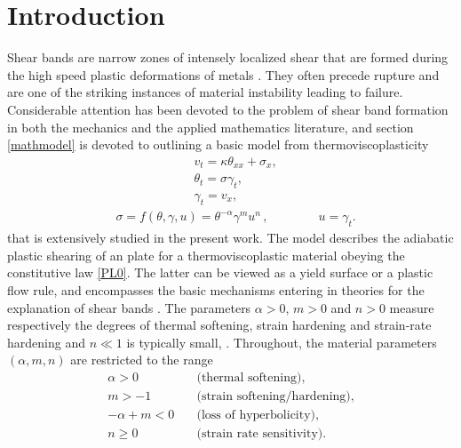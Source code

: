 \documentclass[a4paper,11pt]{article}
\theoremstyle{remark}
\begin{document}
 \tableofcontents


\vfil\eject


\section{Introduction}

Shear bands are narrow zones of intensely localized shear that are formed during the high speed plastic deformations of metals \cite{ZH44, Clifton90,Wright02}. 
They often precede rupture and are one of the striking instances of material instability leading to failure.  Considerable attention has been devoted to the
problem of shear band formation in both the mechanics and the applied mathematics literature, and section \ref{mathmodel} is devoted to outlining
a basic model from thermoviscoplasticity
\begin{equation}
  \label{sbeq}
  \begin{aligned}
    & v_{t} =  \kappa \theta_{ x x} +  \sigma_{x},\\
    & \theta_{t} =  \sigma \gamma_{t}, \\
    & \gamma_{t} = v_{x},
  \end{aligned}
\end{equation}
\begin{align}
&  \sigma =  f(\theta, \gamma, u) = \theta^{-\alpha} \gamma^{m} u^{n} \, , \quad \quad \qquad \text{$u = \gamma_t$}. \label{PL0}
\end{align}
that is extensively studied in the present work. The model describes the adiabatic plastic shearing of an plate for
a thermoviscoplastic material obeying the constitutive law \eqref{PL0}. The latter can be viewed as a yield surface or a plastic flow rule, and encompasses the basic
mechanisms entering in theories for the explanation of shear bands \cite{ZH44,Clifton90}.
The parameters $\alpha>0$, $m>0$ and $n>0$ measure respectively the degrees of thermal softening, strain hardening and  strain-rate hardening and $n \ll 1$
is typically small, \cite{Clifton90}. 
Throughout, the material parameters $(\alpha,m,n)$ are restricted to the range
\begin{equation}
 \begin{aligned}
  \alpha>0\quad&\text{(thermal softening)},\\
  m>-1 \quad&\text{(strain softening/hardening)}, \\%
  -\alpha+m<0 \quad&\text{(loss of hyperbolicity)},\\%
  n\ge0 \quad&\text{(strain rate sensitivity)}. %
\end{aligned}\label{eq:paramrange}
\end{equation}
\end{document}
